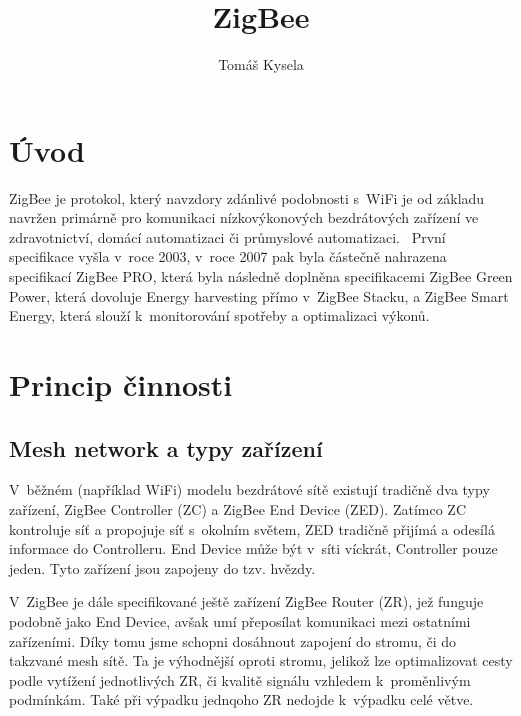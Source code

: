 \documentclass[a4paper,10pt,titlepage]{article}
\author{Tomáš Kysela}
\title{ZigBee}
\date{\parbox{\linewidth}{\centering%
  \today\endgraf\bigskip
 Vytvořeno jako semestrální projekt pro předmět BAB34MNS\endgraf\medskip
 FEL ČVUT}}
\begin{document}
\begin{titlepage}

	\maketitle

	\thispagestyle{empty}
\end{titlepage}


\tableofcontents
\listoffigures

\newpage

\section{Úvod} \label{sec:intro}
ZigBee je protokol, který navzdory zdánlivé podobnosti s~WiFi je od základu navržen primárně pro komunikaci nízkovýkonových bezdrátových zařízení ve zdravotnictví, domácí automatizaci či průmyslové automatizaci.~\cite{zigbee-tech-pres}
První specifikace vyšla v~roce 2003, v~roce 2007 pak byla částečně nahrazena specifikací ZigBee PRO, která byla následně doplněna specifikacemi ZigBee Green Power, která dovoluje Energy harvesting přímo v~ZigBee Stacku, a ZigBee Smart Energy, která slouží k~monitorování spotřeby a optimalizaci výkonů.~\cite{ecstuff4u}

\section{Princip činnosti} \label{sec:spec}

\subsection{Mesh network a typy zařízení} \label{sec:mesh}
V~běžném (například WiFi) modelu bezdrátové sítě existují tradičně dva typy zařízení, ZigBee Controller (ZC) a {ZigBee End Device} (ZED). Zatímco ZC kontroluje síť a propojuje síť s~okolním světem, ZED tradičně přijímá a odesílá informace do Controlleru. End Device může být v~síti víckrát, Controller pouze jeden. Tyto zařízení jsou zapojeny do tzv. hvězdy.

V~ZigBee je dále specifikované ještě zařízení ZigBee Router (ZR), jež funguje podobně jako End Device, avšak umí přeposílat komunikaci mezi ostatními zařízeními. Díky tomu jsme schopni dosáhnout zapojení do stromu, či do takzvané mesh sítě. Ta je výhodnější oproti stromu, jelikož lze optimalizovat cesty podle vytížení jednotlivých ZR, či kvalitě signálu vzhledem k~proměnlivým podmínkám. Také při výpadku jednqoho ZR nedojde k~výpadku celé větve.~\cite{nordic-guide}
\end{document}
